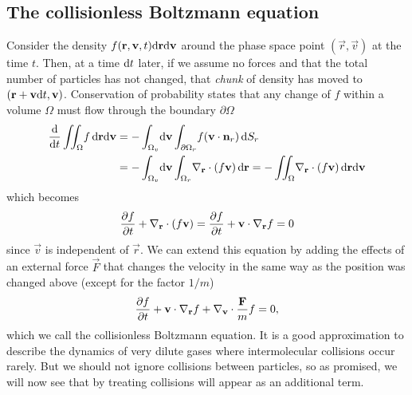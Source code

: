 \subsection{The collisionless Boltzmann equation}
Consider the density $f(\mathbf r, \mathbf v, t)\mathrm{d}\mathbf r\mathrm{d}\mathbf v$ around the phase space point $(\vec r,\vec v)$ at the time $t$. Then, at a time $\mathrm{d}t$ later, if we assume no forces and that the total number of particles has not changed, that \textit{chunk} of density has moved to $(\mathbf r + \mathbf v\mathrm{d}t, \mathbf v)$. Conservation of probability states that any change of $f$ within a volume $\Omega$ must flow through the boundary $\partial \Omega$
\begin{align}
	\frac{\dm }{\dm t}\iint_\Omega\! f\, \dm \vec r \dm \vec v &= -\int_{\Omega_v}\!\dm \vec v\int_{\partial \Omega_r}\! f(\vec v\cdot \vec n_r)\, \dm S_r\\
	&= -\int_{\Omega_v}\!\dm \vec v\int_{\Omega_r}\! \nabla_\vec r\cdot(f\vec v)\, \dm \vec r = -\iint_{\Omega}\! \nabla_\vec r\cdot(f\vec v)\, \dm \vec r\dm \vec v
\end{align}
which becomes
\begin{align}
	\frac{\partial f}{\partial t} + \nabla_\mathbf r \cdot(f\mathbf v) = \frac{\partial f}{\partial t} + \mathbf v\cdot\nabla_\mathbf r f = 0
\end{align}
since $\vec v$ is independent of $\vec r$. We can extend this equation by adding the effects of an external force $\vec F$ that changes the velocity in the same way as the position was changed above (except for the factor $1/m$)
\begin{align}
	\label{eq:collisionless_boltzmann}
	\frac{\partial f}{\partial t} + \mathbf v\cdot\nabla_\mathbf r f + \nabla_\mathbf v \cdot \frac{\mathbf F}{ m}f = 0,
\end{align}
which we call the collisionless Boltzmann equation. It is a good approximation to describe the dynamics of very dilute gases where intermolecular collisions occur rarely. But we should not ignore collisions between particles, so as promised, we will now see that by treating collisions will appear as an additional term.
